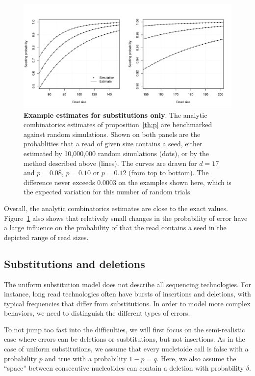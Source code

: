 \documentclass{article}
\begin{document}
\begin{figure}[h]
\centering
\includegraphics[scale=0.445]{simulp.pdf}
\caption{\textbf{Example estimates for substitutions only}. The analytic
combinatorics estimates of proposition~\ref{th:p} are benchmarked against
random simulations. Shown on both panels are the probablities that a read
of given size contains a seed, either estimated by 10,000,000 random
simulations (dots), or by the method described above (lines). The curves
are drawn for $d=17$ and $p=0.08$, $p=0.10$ or $p=0.12$ (from top to
bottom). The difference never exceeds 0.0003 on the examples shown here,
which is the expected variation for this number of random trials.}
\label{fig:simulp}
\end{figure}

Overall, the analytic combinatorics estimates are close to the exact
values. Figure~\ref{fig:simulp} also shows that relatively small changes
in the probability of error have a large influence on the probability of
that the read contains a seed in the depicted range of read sizes.




\subsection{Substitutions and deletions}
\label{sec:deletions}

The uniform substitution model does not describe all sequencing
technologies. For instance, long read technologies often have bursts of
insertions and deletions, with typical frequencies that differ from
substitutions. In order to model more complex behaviors, we need to
distinguish the different types of errors.

To not jump too fast into the difficulties, we will first focus on the
semi-realistic case where errors can be deletions or susbtitutions, but
not insertions. As in the case of uniform substitutions, we assume that
every nucletoide call is false with a probability $p$ and true with a
probability $1-p=q$. Here, we also assume the ``space''  between
consecutive nucleotides can contain a deletion with probability $\delta$.
\end{document}
